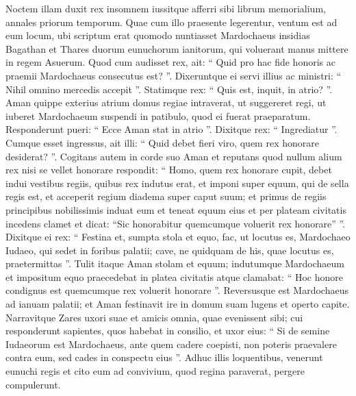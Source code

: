 \begin{biblechapter}
\begin{biblechapter}
\begin{biblechapter}
\begin{biblechapter}
\begin{biblechapter}
\begin{biblechapter}
\verse Noctem illam duxit rex insomnem iussitque afferri sibi librum memorialium, annales priorum temporum. Quae cum illo praesente legerentur, 
\verse ventum est ad eum locum, ubi scriptum erat quomodo nuntiasset Mardochaeus insidias Bagathan et Thares duorum eunuchorum ianitorum, qui voluerant manus mittere in regem Asuerum.
 \verse Quod cum audisset rex, ait: “ Quid pro hac fide honoris ac praemii Mardochaeus consecutus est? ”. Dixeruntque ei servi illius ac ministri: “ Nihil omnino mercedis accepit ”. 
\verse Statimque rex: “ Quis est, inquit, in atrio? ”. Aman quippe exterius atrium domus regiae intraverat, ut suggereret regi, ut iuberet Mardochaeum suspendi in patibulo, quod ei fuerat praeparatum. 
\verse Responderunt pueri: “ Ecce Aman stat in atrio ”. Dixitque rex: “ Ingrediatur ”.
 \verse Cumque esset ingressus, ait illi: “ Quid debet fieri viro, quem rex honorare desiderat? ”. Cogitans autem in corde suo Aman et reputans quod nullum alium rex nisi se vellet honorare 
\verse respondit: “ Homo, quem rex honorare cupit, 
\verse debet indui vestibus regiis, quibus rex indutus erat, et imponi super equum, qui de sella regis est, et acceperit regium diadema super caput suum; 
\verse et primus de regiis principibus nobilissimis induat eum et teneat equum eius et per plateam civitatis incedens clamet et dicat: “Sic honorabitur quemcumque voluerit rex honorare” ”.
 \verse Dixitque ei rex: “ Festina et, sumpta stola et equo, fac, ut locutus es, Mardochaeo Iudaeo, qui sedet in foribus palatii; cave, ne quidquam de his, quae locutus es, praetermittas ”. 
\verse Tulit itaque Aman stolam et equum; indutumque Mardochaeum et impositum equo praecedebat in platea civitatis atque clamabat: “ Hoc honore condignus est quemcumque rex voluerit honorare ”.
 \verse Reversusque est Mardochaeus ad ianuam palatii; et Aman festinavit ire in domum suam lugens et operto capite. 
\verse Narravitque Zares uxori suae et amicis omnia, quae evenissent sibi; cui responderunt sapientes, quos habebat in consilio, et uxor eius: “ Si de semine Iudaeorum est Mardochaeus, ante quem cadere coepisti, non poteris praevalere contra eum, sed cades in conspectu eius ”. 
\verse Adhuc illis loquentibus, venerunt eunuchi regis et cito eum ad convivium, quod regina paraverat, pergere compulerunt.
 

\end{biblechapter}
\end{biblechapter}
\end{biblechapter}
\end{biblechapter}
\end{biblechapter}
\end{biblechapter}
